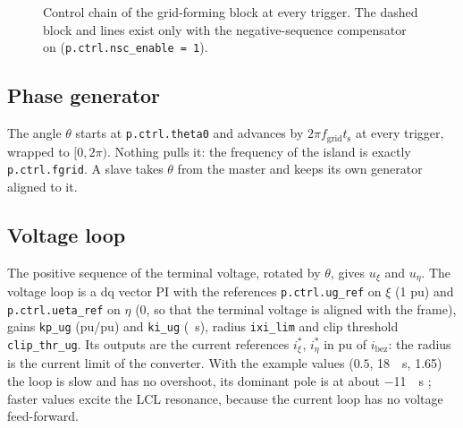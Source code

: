 \documentclass[11pt,a4paper]{scrartcl}
\newcommand{\ped}[1]{_{\mathrm{#1}}}
\newcommand{\code}[1]{\texttt{#1}}
\begin{document}
\begin{onehalfspace}
\begin{figure}[htbp]
{}
	\captionsetup{width=0.9\textwidth, font=small}
	\caption[Control chain of the grid-forming block.]{Control chain of the grid-forming block at every trigger. The dashed block and lines exist only with the negative-sequence compensator on (\code{p.ctrl.nsc\_enable = 1}).}
	\label{fig:gfm_chain}
\end{figure}

\subsection{Phase generator}
\label{sec:phase_gen}

The angle $\theta$ starts at \code{p.ctrl.theta0} and advances by $2\pi f\ped{grid} t\ped{s}$ at every trigger, wrapped to $[0, 2\pi)$. Nothing pulls it: the frequency of the island is exactly \code{p.ctrl.fgrid}. A slave takes $\theta$ from the master and keeps its own generator aligned to it.

\subsection{Voltage loop}
\label{sec:voltage_loop}

The positive sequence of the terminal voltage, rotated by $\theta$, gives $u_\xi$ and $u_\eta$. The voltage loop is a dq vector PI with the references \code{p.ctrl.ug\_ref} on $\xi$ (1 pu) and \code{p.ctrl.ueta\_ref} on $\eta$ (0, so that the terminal voltage is aligned with the frame), gains \code{kp\_ug} (pu/pu) and \code{ki\_ug} (\si{\per\second}), radius \code{ixi\_lim} and clip threshold \code{clip\_thr\_ug}. Its outputs are the current references $i^{*}_\xi$, $i^{*}_\eta$ in pu of $i\ped{bez}$: the radius is the current limit of the converter. With the example values ($0.5$, \SI{18}{\per\second}, \SI{1.65}{\pu}) the loop is slow and has no overshoot, its dominant pole is at about \SI{-11}{\per\second} \cite{gfm_note}; faster values excite the LCL resonance, because the current loop has no voltage feed-forward.


\end{onehalfspace}
\end{document}
